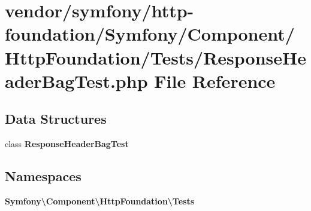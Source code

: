 \section{vendor/symfony/http-\/foundation/\+Symfony/\+Component/\+Http\+Foundation/\+Tests/\+Response\+Header\+Bag\+Test.php File Reference}
\label{_response_header_bag_test_8php}
\subsection*{Data Structures}
\begin{DoxyCompactItemize}
\item 
class {\bf Response\+Header\+Bag\+Test}
\end{DoxyCompactItemize}
\subsection*{Namespaces}
\begin{DoxyCompactItemize}
\item 
 {\bf Symfony\textbackslash{}\+Component\textbackslash{}\+Http\+Foundation\textbackslash{}\+Tests}
\end{DoxyCompactItemize}
